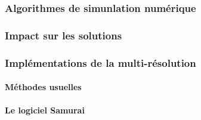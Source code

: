     \paragraph{}
\subsubsection{Algorithmes de simunlation numérique}
    \paragraph{}
    \paragraph{}
\subsubsection{Impact sur les solutions}
    \paragraph{}
    \paragraph{}
\subsubsection{Implémentations de la multi-résolution}
    \paragraph{Méthodes usuelles}
    \paragraph{Le logiciel Samurai}